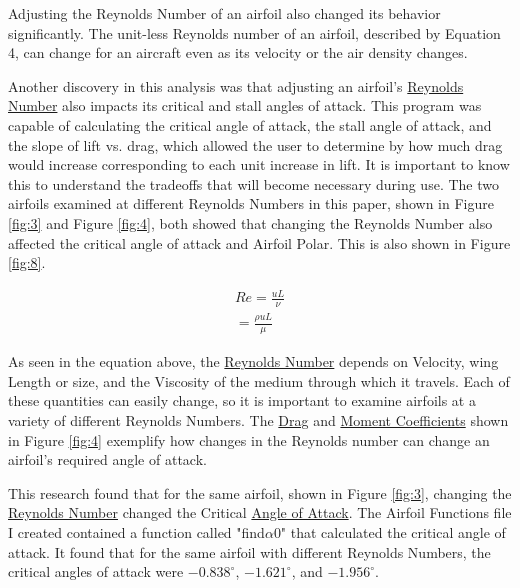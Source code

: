 \documentclass{article}
\begin{document}
Adjusting the Reynolds Number of an airfoil also changed its behavior significantly. The unit-less Reynolds number of an airfoil, described by Equation 4, can change for an aircraft even as its velocity or the air density changes. \newline

Another discovery in this analysis was that adjusting an airfoil's \hyperlink{Re}{Reynolds Number} also impacts its critical and stall angles of attack. This program was capable of calculating the critical angle of attack, the stall angle of attack, and the slope of lift vs. drag, which allowed the user to determine by how much drag would increase corresponding to each unit increase in lift. It is important to know this to understand the tradeoffs that will become necessary during use. The two airfoils examined at different Reynolds Numbers in this paper, shown in Figure \ref{fig:3} and Figure \ref{fig:4}, both showed that changing the Reynolds Number also affected the critical angle of attack and Airfoil Polar. This is also shown in Figure \ref{fig:8}. \newline

\begin{equation} \label{eq:4}
\begin{aligned}
        	Re = \frac{uL}{\nu} \\
	= \frac{\rho uL}{\mu} 
\end{aligned}
\end{equation}
\newline

As seen in the equation above, the \hyperlink{Re}{Reynolds Number} depends on Velocity, wing Length or size, and the Viscosity of the medium through which it travels. Each of these quantities can easily change, so it is important to examine airfoils at a variety of different Reynolds Numbers. The \hyperlink{CD}{Drag} and \hyperlink{CM}{Moment Coefficients} shown in Figure \ref{fig:4} exemplify how changes in the Reynolds number can change an airfoil's required angle of attack. \newline

This research found that for the same airfoil, shown in Figure \ref{fig:3}, changing the \hyperlink{Re}{Reynolds Number} changed the Critical \hyperlink{alpha}{Angle of Attack}. The Airfoil Functions file I created contained a function called "find$\alpha$0" that calculated the critical angle of attack. It found that for the same airfoil with different  Reynolds Numbers, the critical angles of attack were $-0.838^{\circ}$, $-1.621^{\circ}$, and $-1.956^{\circ}$. \newline
\end{document}
